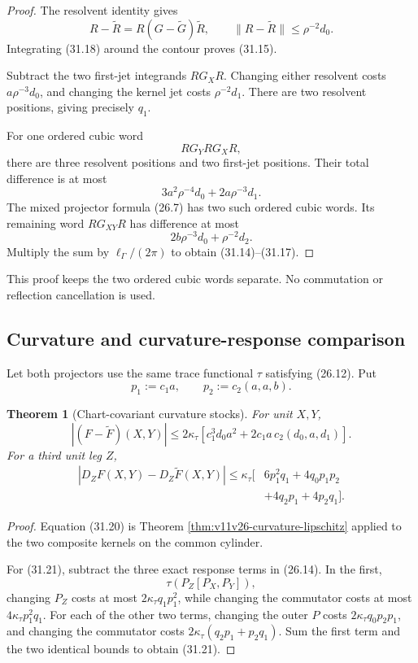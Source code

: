 \documentclass[11pt]{article}
\newtheorem{theorem}{Theorem}[section]
\begin{document}
\begin{proof}
The resolvent identity gives
\[
 R-\widetilde R
 =
 R(G-\widetilde G)\widetilde R,
 \qquad
 \|R-\widetilde R\|\leq\rho^{-2}d_0.
 \tag{31.18}
\]
Integrating (31.18) around the contour proves (31.15).

Subtract the two first-jet integrands \(RG_XR\).  Changing either
resolvent costs \(a\rho^{-3}d_0\), and changing the kernel jet costs
\(\rho^{-2}d_1\).  There are two resolvent positions, giving precisely
\(q_1\).

For one ordered cubic word
\[
 RG_YRG_XR,
\]
there are three resolvent positions and two first-jet positions.
Their total difference is at most
\[
 3a^2\rho^{-4}d_0+2a\rho^{-3}d_1.
\]
The mixed projector formula (26.7) has two such ordered cubic words.
Its remaining word \(RG_{XY}R\) has difference at most
\[
 2b\rho^{-3}d_0+\rho^{-2}d_2.
\]
Multiply the sum by \(\ell_\Gamma/(2\pi)\) to obtain (31.14)--(31.17).
\end{proof}

This proof keeps the two ordered cubic words separate.  No commutation
or reflection cancellation is used.

\subsection{Curvature and curvature-response comparison}

Let both projectors use the same trace functional \(\tau\) satisfying
(26.12).  Put
\[
 p_1:=c_1a,\qquad p_2:=c_2(a,a,b).
 \tag{31.19}
\]

\begin{theorem}[Chart-covariant curvature stocks]
\label{thm:v11v31-curvature-stocks}
For unit \(X,Y\),
\[
 |(F-\widetilde F)(X,Y)|
 \leq
 2\kappa_\tau
 \left[
 c_1^3d_0a^2+2c_1a\,c_2(d_0,a,d_1)
 \right].
 \tag{31.20}
\]
For a third unit leg \(Z\),
\[
 \begin{split}
 |D_ZF(X,Y)-D_Z\widetilde F(X,Y)|
 \leq\kappa_\tau\bigl[
 &6p_1^2q_1+4q_0p_1p_2\\
 &+4q_2p_1+4p_2q_1
 \bigr].
 \end{split}
 \tag{31.21}
\]
\end{theorem}

\begin{proof}
Equation (31.20) is Theorem
\ref{thm:v11v26-curvature-lipschitz} applied to the two composite
kernels on the common cylinder.

For (31.21), subtract the three exact response terms in (26.14).
In the first,
\[
 \tau(P_Z[P_X,P_Y]),
\]
changing \(P_Z\) costs at most
\(2\kappa_\tau q_1p_1^2\), while changing the commutator costs at most
\(4\kappa_\tau p_1^2q_1\).  For each of the other two terms, changing
the outer \(P\) costs
\(2\kappa_\tau q_0p_2p_1\), and changing the commutator costs
\(2\kappa_\tau(q_2p_1+p_2q_1)\).  Sum the first term and the two
identical bounds to obtain (31.21).
\end{proof}
\end{document}
